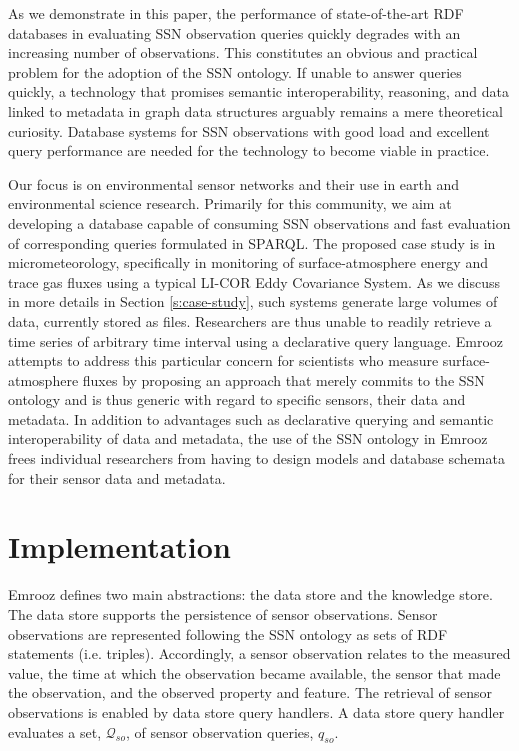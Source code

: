 \documentclass[preprint,12pt,authoryear]{elsarticle}
\begin{document}
As we demonstrate in this paper, the performance of state-of-the-art RDF databases in evaluating SSN observation queries quickly degrades with an increasing number of observations. This constitutes an obvious and practical problem for the adoption of the SSN ontology. If unable to answer queries quickly, a technology that promises semantic interoperability, reasoning, and data linked to metadata in graph data structures arguably remains a mere theoretical curiosity. Database systems for SSN observations with good load and excellent query performance are needed for the technology to become viable in practice.

Our focus is on environmental sensor networks \cite{martinez04esn} and their use in earth and environmental science research. Primarily for this community, we aim at developing a database capable of consuming SSN observations and fast evaluation of corresponding queries formulated in SPARQL. The proposed case study is in micrometeorology, specifically in monitoring of surface-atmosphere energy and trace gas fluxes using a typical LI-COR Eddy Covariance System. As we discuss in more details in Section \ref{s:case-study}, such systems generate large volumes of data, currently stored as files. Researchers are thus unable to readily retrieve a time series of arbitrary time interval using a declarative query language. Emrooz attempts to address this particular concern for scientists who measure surface-atmosphere fluxes by proposing an approach that merely commits to the SSN ontology and is thus generic with regard to specific sensors, their data and metadata. In addition to advantages such as declarative querying and semantic interoperability of data and metadata, the use of the SSN ontology in Emrooz frees individual researchers from having to design models and database schemata for their sensor data and metadata.

\section{Implementation}
\label{s:implementation}
Emrooz defines two main abstractions: the data store and the knowledge store. %
The data store supports the persistence of sensor observations. Sensor observations are represented following the SSN ontology as sets of RDF statements (i.e. triples). Accordingly, a sensor observation relates to the measured value, the time at which the observation became available, the sensor that made the observation, and the observed property and feature. The retrieval of sensor observations is enabled by data store query handlers. A data store query handler evaluates a set, $\mathcal{Q}_{so}$, of sensor observation queries, $q_{so}$.
\end{document}
